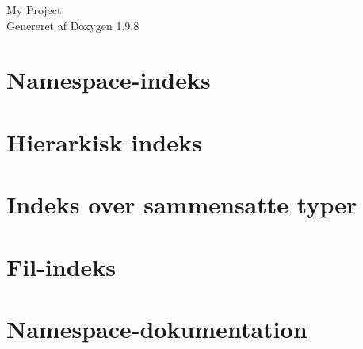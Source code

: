 \documentclass[twoside]{book}
\newcommand{\+}{\discretionary{\mbox{\scriptsize$\hookleftarrow$}}{}{}}
\newcommand{\clearemptydoublepage}{%
    \newpage{\pagestyle{empty}\cleardoublepage}%
  }
\begin{document}
  \raggedbottom
    \hypersetup{pageanchor=false,
                bookmarksnumbered=true,
                pdfencoding=unicode
               }
  \begin{titlepage}
  \vspace*{7cm}
  \begin{center}%
  {\Large My Project}\\
  \vspace*{1cm}
  {\large Genereret af Doxygen 1.9.8}\\
  \end{center}
  \end{titlepage}
  \clearemptydoublepage
  \tableofcontents
  \clearemptydoublepage
  \hypersetup{pageanchor=true}



\chapter{Namespace-\/indeks}

\chapter{Hierarkisk indeks}

\chapter{Indeks over sammensatte typer}

\chapter{Fil-\/indeks}

\chapter{Namespace-\/dokumentation}
















\end{document}
